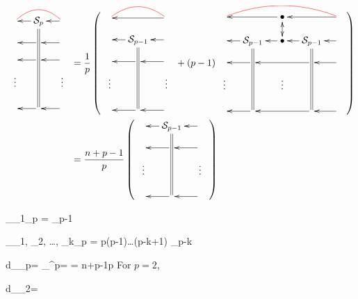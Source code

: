 \begin{align}
\bcen
\xymatrix@R=1pc@C=1pc{
&\cals_p\ar@2{-}[dddd]\ar[l]
&\ar[l]
\ar@[red]@{-}@/_1pc/[ll]
\\
&\ar[l]
&\ar[l]
\\
&\ar[l]
&\ar[l]
\\
\vdots&
&\vdots
\\
&\ar[l]
&\ar[l]
}
\ecen
&=
\frac{1}{p}
\left(
\bcen
\xymatrix@R=1pc@C=1pc{
&
&\ar[ll]
\ar@[red]@{-}@/_1pc/[ll]
\\
&\cals_{p-1}\ar@2{-}[ddd]\ar[l]
&\ar[l]
\\
&\ar[l]
&\ar[l]
\\
\vdots&
&\vdots
\\
&\ar[l]
&\ar[l]
}
\ecen
+
(p-1)
\bcen
\xymatrix@R=1pc@C=1pc{
&
&\bullet\ar[ll]\ar@{<->}[d]
&
&\ar[ll]
\ar@[red]@{-}@/_1pc/[llll]
\\
&\cals_{p-1}\ar@2{-}[ddd]\ar[l]
&\bullet\ar[l]
&\cals_{p-1}\ar@2{-}[ddd]\ar[l]
&\ar[l]
\\
&\ar[l]
&&\ar[ll]
&\ar[l]
\\
\vdots&
&\vdots
&
&
\\
&\ar[l]
&
&\ar[ll]
&\ar[l]
}
\ecen
\right)
\\
&=
\frac{n+p-1}{p}
\left(
\bcen
\xymatrix@R=1pc@C=1pc{
&\cals_{p-1}\ar@2{-}[ddd]\ar[l]
&\ar[l]
\\
&\ar[l]
&\ar[l]
\\
\vdots&
&\vdots
\\
&\ar[l]
&\ar[l]
}
\ecen
\right)
\end{align}


\beq
\tr_{\rva_1}\cals_p = \cals_{p-1}
\eeq

\beq
\tr_{\rva_1, \rva_2, \ldots, \rva_k}\cals_p = 
{p(p-1)\ldots(p-k+1)}
\cals_{p-k}
\eeq

\beq
d_{\cals_p}=
\tr_{\rva^p}\cals=
=
{n+p-1\choose p}
\eeq
For $p=2$, 

\beq
d_{\cals_2}=
\eeq
